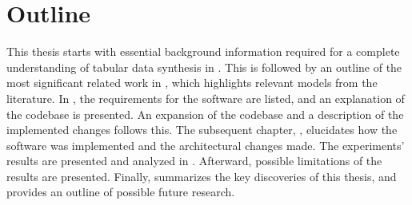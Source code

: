 \newpage
\section{Outline}
\label{ch:intro-outline}

This thesis starts with essential background information required for a complete understanding of tabular data synthesis in .
This is followed by an outline of the most significant related work in , which highlights relevant models from the literature.
In , the requirements for the software are listed, and an explanation of the codebase is presented. 
An expansion of the codebase and a description of the implemented changes follows this. 
The subsequent chapter, , elucidates how the software was implemented and the architectural changes made.
The experiments' results are presented and analyzed in . 
Afterward, possible limitations of the results are presented. 
Finally,  summarizes the key discoveries of this thesis, and provides an outline of possible future research.